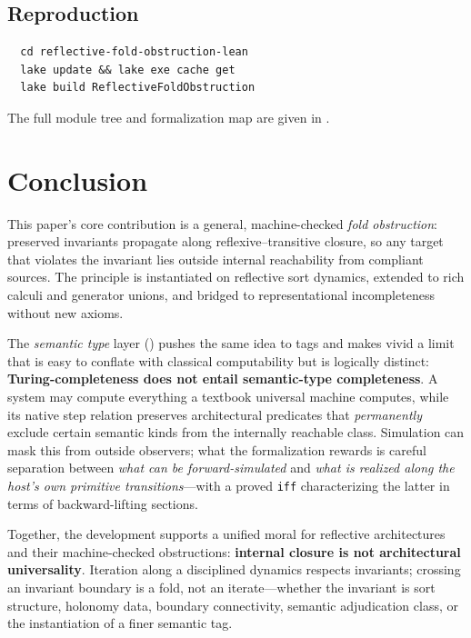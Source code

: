 \documentclass[11pt]{article}
\theoremstyle{plain}
\theoremstyle{definition}
\theoremstyle{remark}
\begin{document}
\subsection*{Reproduction}

\begin{verbatim}
  cd reflective-fold-obstruction-lean
  lake update && lake exe cache get
  lake build ReflectiveFoldObstruction
\end{verbatim}

\noindent
The full module tree and formalization map are given in .

\section{Conclusion}\label{sec:conclusion}

This paper's core contribution is a general, machine-checked \emph{fold obstruction}:
preserved invariants propagate along reflexive--transitive closure, so any target that
violates the invariant lies outside internal reachability from compliant sources.  The
principle is instantiated on reflective sort dynamics, extended to rich calculi and
generator unions, and bridged to representational incompleteness without new axioms.

\medskip
The \emph{semantic type} layer () pushes the same idea to tags
and makes vivid a limit that is easy to conflate with classical computability but is
logically distinct: \textbf{Turing-completeness does not entail semantic-type
completeness}.  A system may compute everything a textbook universal machine computes,
while its native step relation preserves architectural predicates that \emph{permanently}
exclude certain semantic kinds from the internally reachable class.  Simulation can mask
this from outside observers; what the formalization rewards is careful separation between
\emph{what can be forward-simulated} and \emph{what is realized along the host's own
primitive transitions}---with a proved \texttt{iff} characterizing the latter in terms of
backward-lifting sections.

\medskip
Together, the development supports a unified moral for reflective architectures and their
machine-checked obstructions: \textbf{internal closure is not architectural
universality}.  Iteration along a disciplined dynamics respects invariants; crossing an
invariant boundary is a fold, not an iterate---whether the invariant is sort structure,
holonomy data, boundary connectivity, semantic adjudication class, or the instantiation
of a finer semantic tag.
\end{document}
